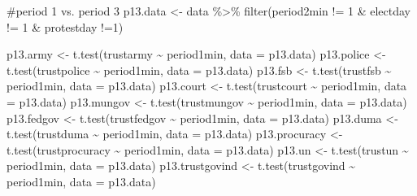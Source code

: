 \documentclass[
  letterpaper,
  DIV=11,
  numbers=noendperiod]{scrartcl}
\newenvironment{Shaded}{\begin{snugshade}}{\end{snugshade}}
\newcommand{\AttributeTok}[1]{\textcolor[rgb]{0.40,0.45,0.13}{#1}}
\newcommand{\CommentTok}[1]{\textcolor[rgb]{0.37,0.37,0.37}{#1}}
\newcommand{\DecValTok}[1]{\textcolor[rgb]{0.68,0.00,0.00}{#1}}
\newcommand{\FunctionTok}[1]{\textcolor[rgb]{0.28,0.35,0.67}{#1}}
\newcommand{\NormalTok}[1]{\textcolor[rgb]{0.00,0.23,0.31}{#1}}
\newcommand{\OtherTok}[1]{\textcolor[rgb]{0.00,0.23,0.31}{#1}}
\newcommand{\SpecialCharTok}[1]{\textcolor[rgb]{0.37,0.37,0.37}{#1}}
\begin{document}
\begin{Shaded}
\begin{Highlighting}[]
\CommentTok{\#period 1 vs. period 3}
\NormalTok{p13.data }\OtherTok{\textless{}{-}}\NormalTok{ data }\SpecialCharTok{\%\textgreater{}\%} \FunctionTok{filter}\NormalTok{(period2min }\SpecialCharTok{!=} \DecValTok{1} \SpecialCharTok{\&}\NormalTok{ electday }\SpecialCharTok{!=} \DecValTok{1} \SpecialCharTok{\&}\NormalTok{ protestday }\SpecialCharTok{!=}\DecValTok{1}\NormalTok{)}

\NormalTok{p13.army }\OtherTok{\textless{}{-}} \FunctionTok{t.test}\NormalTok{(trustarmy }\SpecialCharTok{\textasciitilde{}}\NormalTok{ period1min, }\AttributeTok{data =}\NormalTok{ p13.data)}
\NormalTok{p13.police }\OtherTok{\textless{}{-}} \FunctionTok{t.test}\NormalTok{(trustpolice }\SpecialCharTok{\textasciitilde{}}\NormalTok{ period1min, }\AttributeTok{data =}\NormalTok{ p13.data)}
\NormalTok{p13.fsb }\OtherTok{\textless{}{-}} \FunctionTok{t.test}\NormalTok{(trustfsb }\SpecialCharTok{\textasciitilde{}}\NormalTok{ period1min, }\AttributeTok{data =}\NormalTok{ p13.data)}
\NormalTok{p13.court }\OtherTok{\textless{}{-}} \FunctionTok{t.test}\NormalTok{(trustcourt }\SpecialCharTok{\textasciitilde{}}\NormalTok{ period1min, }\AttributeTok{data =}\NormalTok{ p13.data)}
\NormalTok{p13.mungov }\OtherTok{\textless{}{-}} \FunctionTok{t.test}\NormalTok{(trustmungov }\SpecialCharTok{\textasciitilde{}}\NormalTok{ period1min, }\AttributeTok{data =}\NormalTok{ p13.data)}
\NormalTok{p13.fedgov }\OtherTok{\textless{}{-}} \FunctionTok{t.test}\NormalTok{(trustfedgov }\SpecialCharTok{\textasciitilde{}}\NormalTok{ period1min, }\AttributeTok{data =}\NormalTok{ p13.data)}
\NormalTok{p13.duma }\OtherTok{\textless{}{-}} \FunctionTok{t.test}\NormalTok{(trustduma }\SpecialCharTok{\textasciitilde{}}\NormalTok{ period1min, }\AttributeTok{data =}\NormalTok{ p13.data)}
\NormalTok{p13.procuracy }\OtherTok{\textless{}{-}} \FunctionTok{t.test}\NormalTok{(trustprocuracy }\SpecialCharTok{\textasciitilde{}}\NormalTok{ period1min, }\AttributeTok{data =}\NormalTok{ p13.data)}
\NormalTok{p13.un }\OtherTok{\textless{}{-}} \FunctionTok{t.test}\NormalTok{(trustun }\SpecialCharTok{\textasciitilde{}}\NormalTok{ period1min, }\AttributeTok{data =}\NormalTok{ p13.data)}
\NormalTok{p13.trustgovind }\OtherTok{\textless{}{-}} \FunctionTok{t.test}\NormalTok{(trustgovind }\SpecialCharTok{\textasciitilde{}}\NormalTok{ period1min, }\AttributeTok{data =}\NormalTok{ p13.data)}
\end{Highlighting}
\end{Shaded}
\end{document}
